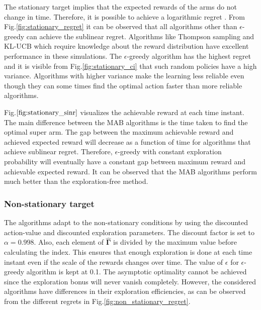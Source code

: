 \documentclass[english, 12pt, a4paper, elec, utf8, a-1b, online]{aaltothesis}
\newcommand{\vsinrb}{\widehat{\boldsymbol{\Gamma}}}
\begin{document}
The stationary target implies that the expected rewards of the arms do not change in time.
Therefore, it is possible to achieve a logarithmic regret \cite{Lattimore2019}.
From Fig.\ref{fig:stationary_regret} it can be observed that all algorithms other than $\epsilon$-greedy can achieve the sublinear regret.
Algorithms like Thompson sampling and KL-UCB which require knowledge about the reward distribution have excellent performance in these simulations.
The $\epsilon$-greedy algorithm has the highest regret and it is visible from Fig.\ref{fig:stationary_ci} that such random policies have a high variance.
Algorithms with higher variance make the learning less reliable even though they can some times find the optimal action faster than more reliable algorithms.

Fig.$\ref{fig:stationary_sinr}$ visualizes the achievable reward at each time instant.
The main difference between the MAB algorithms is the time taken to find the optimal super arm.
The gap between the maximum achievable reward and achieved expected reward will decrease as a function of time for algorithms that achieve sublinear regret.
Therefore, $\epsilon$-greedy with constant exploration probability will eventually have a constant gap between maximum reward and achievable expected reward.
It can be observed that the MAB algorithms perform much better than the exploration-free method.

\subsubsection{Non-stationary target}


The algorithms adapt to the non-stationary conditions by using the discounted action-value and discounted exploration parameters.
The discount factor is set to $\alpha = 0.998$.
Also, each element of $\vsinrb$ is divided by the maximum value before calculating the index.
This ensures that enough exploration is done at each time instant even if the scale of the rewards changes over time.
The value of $\epsilon$ for $\epsilon$-greedy algorithm is kept at 0.1.
The asymptotic optimality cannot be achieved since the exploration bonus will never vanish completely.
However, the considered algorithms have differences in their exploration efficiencies, as can be observed from the different regrets in Fig.\ref{fig:non_stationary_regret}.
\end{document}
